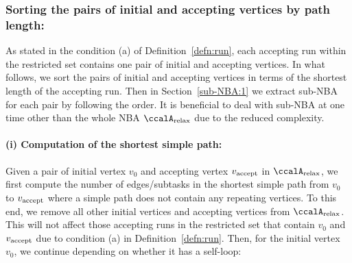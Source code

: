 \documentclass[Afour,sageh,times]{sagej}
\newcommand{\auto}[1]{\ccalA_{\textup{#1}}}
\newcommand{\vertex}[1]{v_{\textup{#1}}}
\begin{document}
{%

  \subsubsection{Sorting the pairs of initial and accepting vertices by path length:}\label{sec:sort}  As stated in the condition (a) of Definition~\ref{defn:run}, each accepting run within the restricted set  contains  one pair of initial and accepting vertices. In what follows, we sort the pairs of initial and accepting vertices in terms of the shortest length of the accepting run.  Then in Section~\ref{sub-NBA:1} we extract sub-NBA for each pair by following the order. It is beneficial to deal with sub-NBA at one time other than the whole NBA $\auto{relax}$ due to the reduced complexity.
 \paragraph{(i) Computation of the shortest simple path:} Given a pair of initial vertex $v_0$ and accepting vertex $\vertex{accept}$ in $\auto{relax}$, we first compute the number of edges/subtasks in the shortest simple path from  $v_0$ to $\vertex{accept}$ where a simple path does not contain any  repeating vertices. To this end, we remove all other initial vertices and accepting vertices from $\auto{relax}$. This will not affect those accepting runs in the restricted set that contain $v_0$ and $\vertex{accept}$ due to condition (a) in Definition~\ref{defn:run}.  Then, for the initial vertex $v_0$, we continue depending on whether it has a self-loop:
}
\end{document}
